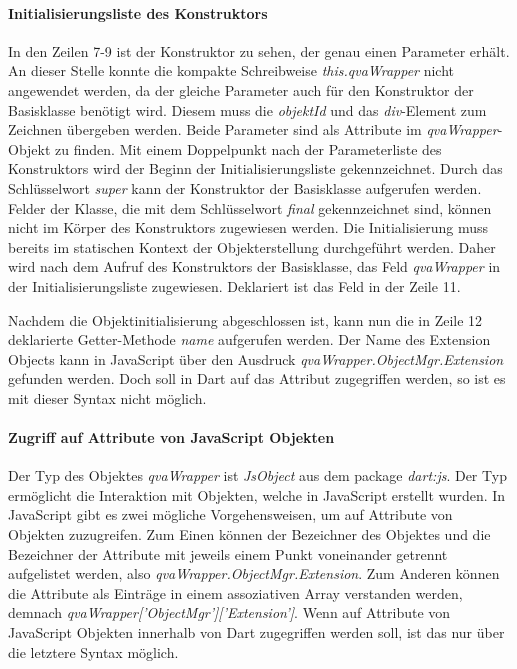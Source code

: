 \paragraph{Initialisierungsliste des Konstruktors} 


In den Zeilen 7-9 ist der Konstruktor zu sehen, der genau einen Parameter erhält. An dieser Stelle konnte die kompakte Schreibweise \textit{this.qvaWrapper} nicht angewendet werden, da der gleiche Parameter auch für den Konstruktor der Basisklasse benötigt wird. Diesem muss die \textit{objektId} und das \textit{div}-Element zum Zeichnen übergeben werden. Beide Parameter sind als Attribute im \textit{qvaWrapper}-Objekt zu finden. Mit einem Doppelpunkt nach der Parameterliste des Konstruktors wird der Beginn der Initialisierungsliste gekennzeichnet. Durch das Schlüssel\-wort \textit{super} kann der Konstruktor der Basisklasse aufgerufen werden. Felder der Klasse, die mit dem Schlüssel\-wort \textit{final} gekennzeichnet sind, können nicht im Körper des Konstruktors zugewiesen werden. Die Initialisierung muss bereits im statischen Kontext der Objekterstellung durchgeführt werden. Daher wird nach dem Aufruf des Konstruktors der Basisklasse, das Feld \textit{qvaWrapper} in der Initialisierungsliste zugewiesen. Deklariert ist das Feld in der Zeile 11.

Nachdem die Objektinitialisierung abgeschlossen ist, kann nun die in Zeile 12 deklarierte Getter-Methode \textit{name} aufgerufen werden. Der Name des Extension Objects kann in JavaScript über den Ausdruck \textit{qvaWrapper.ObjectMgr.Extension} gefunden werden. Doch soll in Dart auf das Attribut zugegriffen werden, so ist es mit dieser Syntax nicht möglich.

\paragraph{Zugriff auf Attribute von JavaScript Objekten} Der Typ des Objektes \textit{qvaWrapper} ist \textit{JsObject} aus dem package \textit{dart:js}. Der Typ ermöglicht die Interaktion mit Objekten, welche in JavaScript erstellt wurden. In JavaScript gibt es zwei mögliche Vorgehensweisen, um auf Attribute von Objekten zuzugreifen. Zum Einen können der Bezeichner des Objektes und die Bezeichner der Attribute mit jeweils einem Punkt voneinander getrennt aufgelistet werden, also \textit{qvaWrapper.ObjectMgr.Extension}. Zum Anderen können die Attribute als Einträge in einem assoziativen Array verstanden werden, demnach \textit{qvaWrapper['ObjectMgr']['Extension']}. Wenn auf Attribute von JavaScript Objekten innerhalb von Dart zugegriffen werden soll, ist das nur über die letztere Syntax möglich.

